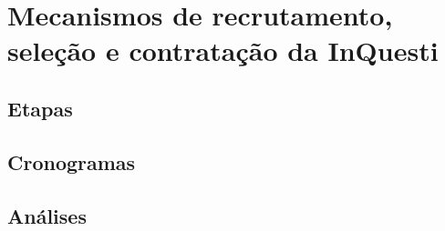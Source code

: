 \chapter{Mecanismos de recrutamento, seleção e contratação da InQuesti}

\section{Etapas}


\section{Cronogramas}


\section{Análises}




